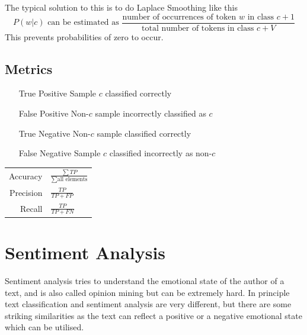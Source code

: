 \documentclass[11pt]{article}
\begin{document}
The typical solution to this is to do Laplace Smoothing like this
\begin{equation*}
	P(w|c)\text{ can be estimated as }\frac{\text{number of occurrences of token $w$ in class } c + 1}{\text{total number of tokens in class } c+V}
\end{equation*}
This prevents probabilities of zero to occur.

\subsection{Metrics}
\begin{itemize}[leftmargin=*, labelindent=3cm, labelsep=1cm]
	\item[True Positive] Sample $c$ classified correctly
	\item[False Positive] Non-$c$ sample incorrectly classified as $c$
	\item[True Negative] Non-$c$ sample classified correctly
	\item[False Negative] Sample $c$ classified incorrectly as non-$c$
\end{itemize}

\begingroup
	\renewcommand{\arraystretch}{1.5}
	\begin{tabularx}{\linewidth}{rX}
		Accuracy & $ \frac{\sum TP}{\sum \text{all elements}} $ \\
		Precision & $\frac{TP}{TP + FP}$\\
		Recall & $ \frac{TP}{TP + FN} $\\
	\end{tabularx}
\endgroup

\section{Sentiment Analysis}
Sentiment analysis tries to understand the emotional state of the author of a text, and is also called opinion mining but can be extremely hard. In principle text classification and sentiment analysis are very different, but there are some striking similarities as the text can reflect a positive or a negative emotional state which can be utilised.
\end{document}
